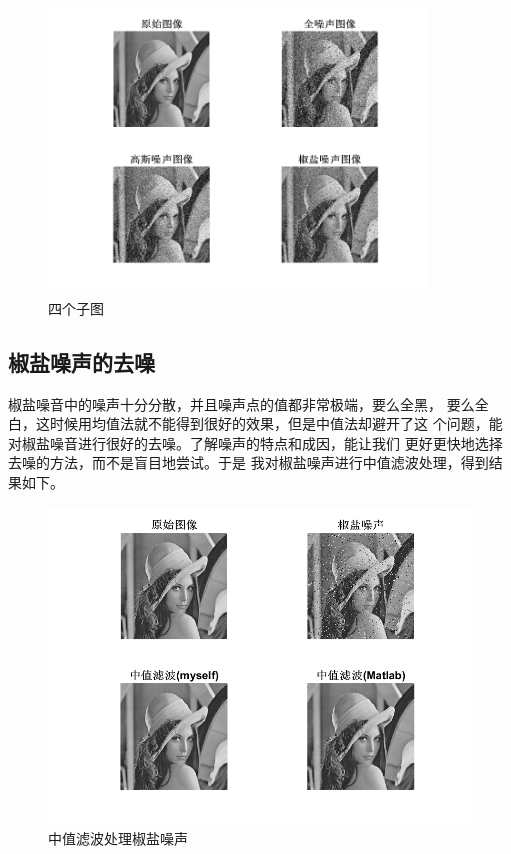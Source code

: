 \documentclass[a4paper,left=2.5cm,right=2.5cm]{article}
\begin{document}
\begin{spacing}{1.6}
		\begin{figure}[H]
			\includegraphics[width=0.9\textwidth]{image/result_subplot.png}
			\caption{四个子图}
			\label{subplot}
		\end{figure}
		\subsection{椒盐噪声的去噪}
		椒盐噪音中的噪声十分分散，并且噪声点的值都非常极端，要么全黑，
		要么全白，这时候用均值法就不能得到很好的效果，但是中值法却避开了这
		个问题，能对椒盐噪音进行很好的去噪。了解噪声的特点和成因，能让我们
		更好更快地选择去噪的方法，而不是盲目地尝试。于是
		我对椒盐噪声进行中值滤波处理，得到结果如下。
		\begin{figure}[H]
			\includegraphics[width=\textwidth]{image/result_midfilter_salt.png}
			\caption{中值滤波处理椒盐噪声}
		\end{figure}
		

\end{spacing}
\end{document}
